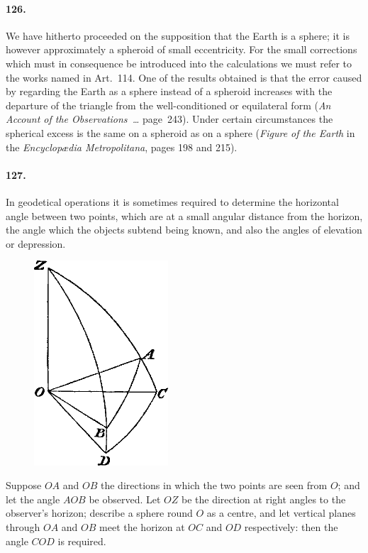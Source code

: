 \documentclass{book}[2004/02/16]
\begin{document}
\begin{mainmatter}
\begin{spacing}{1.3}
\paragraph{126.} We have hitherto proceeded on the supposition that the
Earth is a sphere; it is however approximately a spheroid of small
eccentricity. For the small corrections which must in consequence
be introduced into the calculations we must refer to the works
named in Art.\ 114. One of the results obtained is that the error
caused by regarding the Earth as a sphere instead of a spheroid increases
with the departure of the triangle from the well-conditioned
or equilateral form (\textit{An Account of the Observations~\ldots} page~243).
Under certain circumstances the spherical excess is the same on a
spheroid as on a sphere (\textit{Figure of the Earth} in the \textit{Encyclop\ae dia
Metropolitana}, pages 198 and 215).

\paragraph{127.} In geodetical operations it is sometimes required to determine
the horizontal angle between two points, which are at a
small angular distance from the horizon, the angle which the
objects subtend being known, and also the angles of elevation
or depression.
\begin{figure}[htp]
\centering
\includegraphics[width=5.0cm]{images/102fc}
\end{figure}

Suppose $OA$ and $OB$ the directions in which the two points
are seen from $O$; and let the angle $AOB$ be observed. Let $OZ$ be
the direction at right angles to the observer's horizon; describe
a sphere round $O$ as a centre, and let vertical planes through $OA$
and $OB$ meet the horizon at $OC$ and $OD$ respectively: then the
angle $COD$ is required.


\end{spacing}
\end{mainmatter}
\end{document}
